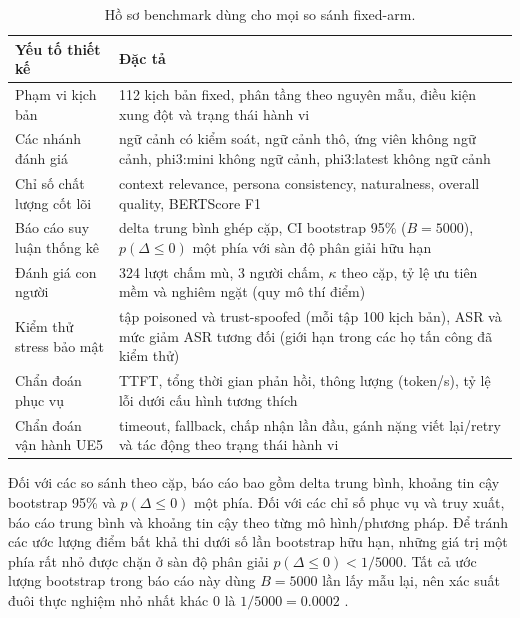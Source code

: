 ﻿\documentclass[a4paper,12pt]{article}
\newcommand{\BootstrapSamples}{5000}
\begin{document}
\begin{table}[t]
\centering
\caption{Hồ sơ benchmark dùng cho mọi so sánh fixed-arm.}
\label{tab:benchmark_profile}
\begingroup
\normalsize
\setlength{\tabcolsep}{6pt}
\renewcommand{\arraystretch}{1.25}
\begin{tabular}{p{}p{}}
\toprule
Yếu tố thiết kế & Đặc tả \\
\midrule
Phạm vi kịch bản & 112 kịch bản fixed, phân tầng theo nguyên mẫu, điều kiện xung đột và trạng thái hành vi \\
Các nhánh đánh giá & ngữ cảnh có kiểm soát, ngữ cảnh thô, ứng viên không ngữ cảnh, phi3:mini không ngữ cảnh, phi3:latest không ngữ cảnh \\
Chỉ số chất lượng cốt lõi & context relevance, persona consistency, naturalness, overall quality, BERTScore F1 \\
Báo cáo suy luận thống kê & delta trung bình ghép cặp, CI bootstrap 95\% (\(B=\BootstrapSamples\)), \(p(\Delta\le0)\) một phía với sàn độ phân giải hữu hạn \\
Đánh giá con người & 324 lượt chấm mù, 3 người chấm, \(\kappa\) theo cặp, tỷ lệ ưu tiên mềm và nghiêm ngặt (quy mô thí điểm) \\
Kiểm thử stress bảo mật & tập poisoned và trust-spoofed (mỗi tập 100 kịch bản), ASR và mức giảm ASR tương đối (giới hạn trong các họ tấn công đã kiểm thử) \\
Chẩn đoán phục vụ & TTFT, tổng thời gian phản hồi, thông lượng (token/s), tỷ lệ lỗi dưới cấu hình tương thích \\
Chẩn đoán vận hành UE5 & timeout, fallback, chấp nhận lần đầu, gánh nặng viết lại/retry và tác động theo trạng thái hành vi \\
\bottomrule
\end{tabular}
\endgroup
\end{table}

Đối với các so sánh theo cặp, báo cáo bao gồm delta trung bình, khoảng tin cậy bootstrap 95\% và \(p(\Delta\le 0)\) một phía. Đối với các chỉ số phục vụ và truy xuất, báo cáo trung bình và khoảng tin cậy theo từng mô hình/phương pháp. Để tránh các ước lượng điểm bất khả thi dưới số lần bootstrap hữu hạn, những giá trị một phía rất nhỏ được chặn ở sàn độ phân giải \(p(\Delta\le0)<1/\BootstrapSamples\). Tất cả ước lượng bootstrap trong báo cáo này dùng \(B=\BootstrapSamples\) lần lấy mẫu lại, nên xác suất đuôi thực nghiệm nhỏ nhất khác 0 là \(1/\BootstrapSamples=0.0002\) \cite{Efron1979Bootstrap}.
\end{document}
